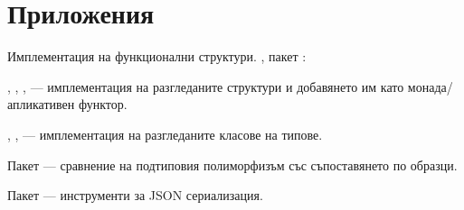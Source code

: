 \chapter*{Приложения}
\label{sec:attachments}

\begin{attachment}{Имплементация на функционални структури.}
  , пакет :
  
  \begin{itemize*}
    \item {}, , ,  — имплементация на разгледаните структури и добавянето им като монада/апликативен функтор.
    
    \item {}, ,  — имплементация на разгледаните класове на типове.
    
    \item Пакет  — сравнение на подтиповия полиморфизъм със съпоставянето по образци.
    
    \item Пакет  — инструменти за JSON сериализация.
  \end{itemize*}
\end{attachment}